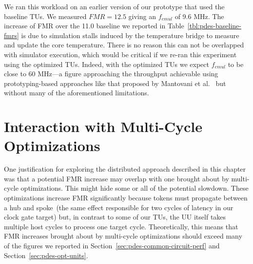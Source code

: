 We ran this workload on an earlier version of our prototype that used the
baseline TUs. We measured $FMR = 12.5$ giving an $f_{emul}$ of 9.6 MHz. The
increase of FMR over the 11.0 baseline we reported in
Table~\ref{tbl:pdes-baseline-fmrs} is due to simulation stalls induced by the
temperature bridge to measure and update the core temperature.  There is no
reason this can not be overlapped with simulator execution, which would be
critical if we re-ran this experiment using the optimized TUs. Indeed, with the optimized TUs we
expect $f_{emul}$ to be close to 60 MHz---a figure approaching the throughput
achievable using prototyping-based approaches like that proposed by Mantovani et
al.~\cite{DVFSPrototype} but without many of the aforementioned limitations.

\section{Interaction with Multi-Cycle Optimizations}\label{sec:pdes-latency-overlapping}

One justification for exploring the distributed approach described in this
chapter was that a potential FMR increase may overlap with one brought about by
multi-cycle optimizations. This might hide some or all of the potential slowdown. These
optimizations increase FMR significantly because tokens must propagate between
a hub and spoke~(the same effect responsible for two cycles of latency in our
clock gate target) but, in contrast to some of our TUs, the UU
itself takes multiple host cycles to process one target cycle. Theoretically,
this means that FMR increases brought about by multi-cycle optimizations should
exceed many of the figures we reported in
Section~\ref{sec:pdes-common-circuit-perf} and
Section~\ref{sec:pdes-opt-units}.

